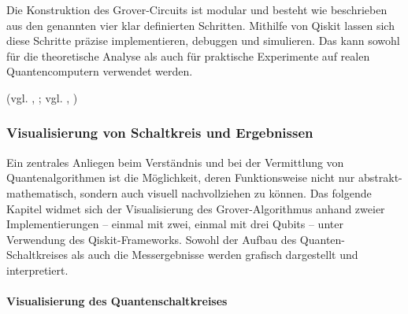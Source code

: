 Die Konstruktion des Grover-Circuits ist modular und besteht wie beschrieben aus den genannten vier klar definierten Schritten. Mithilfe von Qiskit lassen sich diese Schritte präzise implementieren, debuggen und simulieren. Das kann sowohl für die theoretische Analyse als auch für praktische Experimente auf realen Quantencomputern verwendet werden.

(vgl. \citeauthor{ibm_quantum_nodate}, \citeyear{ibm_quantum_nodate}; vgl. \citeauthor{noauthor_grovers_nodate}, \citeyear{noauthor_grovers_nodate})

\subsubsection{Visualisierung von Schaltkreis und Ergebnissen}

\setlength{\parindent}{0pt} %
\setlength{\parskip}{1em}   %

Ein zentrales Anliegen beim Verständnis und bei der Vermittlung von Quantenalgorithmen ist die Möglichkeit, deren Funktionsweise nicht nur abstrakt-mathematisch, sondern auch visuell nachvollziehen zu können. Das folgende Kapitel widmet sich der Visualisierung des Grover-Algorithmus anhand zweier Implementierungen – einmal mit zwei, einmal mit drei Qubits – unter Verwendung des Qiskit-Frameworks. Sowohl der Aufbau des Quanten-Schaltkreises als auch die Messergebnisse werden grafisch dargestellt und interpretiert.

\paragraph*{Visualisierung des Quantenschaltkreises}
\mbox{}

